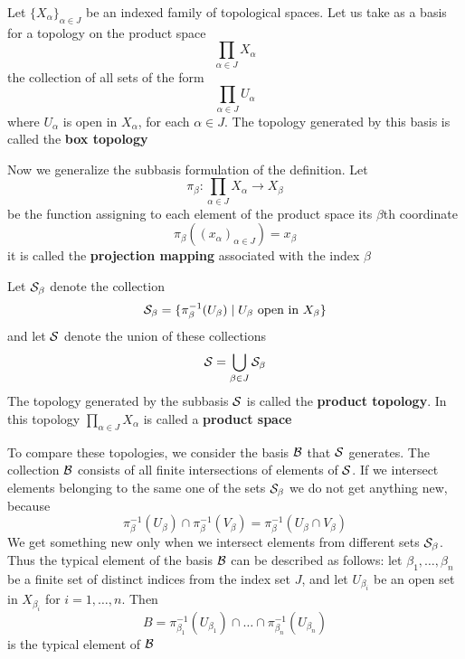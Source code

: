 \documentclass[11pt]{article}
\begin{document}
\begin{definition}[]
Let \(\{X_\alpha\}_{\alpha\in J}\) be an indexed family of topological spaces. Let us take as a basis for a
topology on the product space
\begin{equation*}
\prod_{\alpha\in J}X_\alpha
\end{equation*}
the collection of all sets of the form
\begin{equation*}
\prod_{\alpha\in J}U_\alpha
\end{equation*}
where \(U_\alpha\) is open in \(X_\alpha\), for each \(\alpha\in J\). The topology generated by this basis is
called the \textbf{box topology}
\end{definition}

Now we generalize the subbasis formulation of the definition. Let
\begin{equation*}
\pi_\beta:\prod_{\alpha\in J}X_\alpha\to X_\beta
\end{equation*}
be the function assigning to each element of the product space its \(\beta\)th coordinate
\begin{equation*}
\pi_\beta((x_\alpha)_{\alpha\in J})=x_\beta
\end{equation*}
it is called the \textbf{projection mapping} associated with the index \(\beta\)

\begin{definition}[]
Let \(\mathcal{S}_\beta\) denote the collection
\begin{equation*}
\mathcal{S}_\beta=\{\pi_\beta^{-1}(U_\beta)\mid U_\beta\text{ open in }X_\beta\}
\end{equation*}
and let \(\mathcal{S}\) denote the union of these collections
\begin{equation*}
\mathcal{S}=\bigcup_{\beta\in J}\mathcal{S}_\beta
\end{equation*}
The topology generated by the subbasis \(\mathcal{S}\)  is called the \textbf{product topology}. In this
topology \(\prod_{\alpha\in J}X_\alpha\) is called a \textbf{product space}
\end{definition}

To compare these topologies, we consider the basis \(\mathcal{B}\) that \(\mathcal{S}\) generates. The
collection \(\mathcal{B}\) consists of all finite intersections of elements of \(\mathcal{S}\). If we intersect
elements belonging to the same one of the sets \(\mathcal{S}_\beta\) we do not get anything new, because
\begin{equation*}
\pi_\beta^{-1}(U_\beta)\cap\pi_\beta^{-1}(V_\beta)=\pi_\beta^{-1}(U_\beta\cap V_\beta)
\end{equation*}
We get something new only when we intersect elements from different sets \(\mathcal{S}_\beta\). Thus the typical
element of the basis \(\mathcal{B}\) can be described as follows: let \(\beta_1,\dots,\beta_n\) be a finite set of
distinct indices from the index set \(J\), and let \(U_{\beta_i}\) be an open set in \(X_{\beta_i}\)
for \(i=1,\dots,n\). Then
\begin{equation*}
B=\pi_{\beta_1}^{-1}(U_{\beta_1})\cap\dots\cap\pi_{\beta_n}^{-1}(U_{\beta_n})
\end{equation*}
is the typical element of \(\mathcal{B}\)
\end{document}
